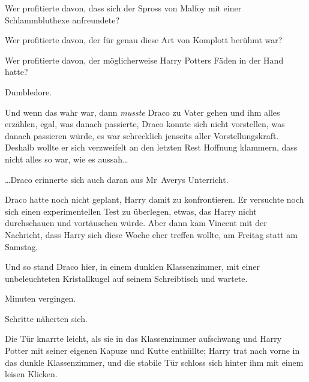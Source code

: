 Wer profitierte davon, dass sich der Spross von Malfoy mit einer Schlammbluthexe anfreundete?

Wer profitierte davon, der für genau diese Art von Komplott berühmt war?

Wer profitierte davon, der möglicherweise Harry Potters Fäden in der Hand hatte?

Dumbledore.

Und wenn das wahr war, dann \emph{musste} Draco zu Vater gehen und ihm alles erzählen, egal, was danach passierte, Draco konnte sich nicht vorstellen, was danach passieren würde, es war schrecklich jenseits aller Vorstellungskraft. Deshalb wollte er sich verzweifelt an den letzten Rest Hoffnung klammern, dass nicht alles so war, wie es aussah…

…Draco erinnerte sich auch daran aus Mr~Averys Unterricht.

Draco hatte noch nicht geplant, Harry damit zu konfrontieren. Er versuchte noch sich einen experimentellen Test zu überlegen, etwas, das Harry nicht durchschauen und vortäuschen würde. Aber dann kam Vincent mit der Nachricht, dass Harry sich diese Woche eher treffen wollte, am Freitag statt am Samstag.

Und so stand Draco hier, in einem dunklen Klassenzimmer, mit einer unbeleuchteten Kristallkugel auf seinem Schreibtisch und wartete.

Minuten vergingen.

Schritte näherten sich.

Die Tür knarrte leicht, als sie in das Klassenzimmer aufschwang und Harry Potter mit seiner eigenen Kapuze und Kutte enthüllte; Harry trat nach vorne in das dunkle Klassenzimmer, und die stabile Tür schloss sich hinter ihm mit einem leisen Klicken.

